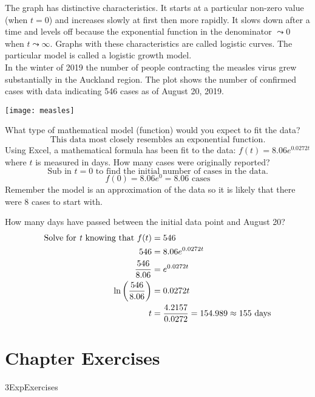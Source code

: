 The graph has distinctive characteristics. It starts at a particular non-zero value (when $t =0$) and increases slowly at first then more rapidly. It slows down after a time and levels off because the exponential function in the denominator $ \leadsto 0$ when $t \leadsto \infty $. Graphs with these characteristics are called logistic curves. The particular model is called a logistic growth model. 
\clearpage
\examq\medskip \\In the winter of 2019 the number of people contracting the measles virus grew substantially in the Auckland region. The plot shows the number of confirmed cases with data indicating 546 cases as of August 20, 2019.
\begin{center}
	\texttt{[image: measles]}
\end{center}
\begin{tasks}
	\task What type of mathematical model (function) would you expect to fit the data?\\
	\[\text{This data most closely resembles an exponential function.}\]
	\task Using Excel, a mathematical formula has been fit to the data:	$\displaystyle f(t)=8.06e^{0.0272t}$ where $t$ is measured in days. How many cases were originally reported?\\
	\[\text{Sub in $t=0$ to find the initial number of cases in the data.}\]
	\[f(0)=8.06e^0=8.06 \text{ cases}\]
	Remember the model is an approximation of the data so it is likely that there were 8 cases to start with.
	
	\task How many days have passed between the initial data point and August 20?\\
	\begin{align*}\text{Solve for \textit{t} knowing that }f(t)&=546\\
	546&=8.06e^{0.0272t}\\
	\frac{546}{8.06}&=e^{0.0272t}\\
	\ln\left(\frac{546}{8.06}\right)&=0.0272t\\
	t&=\frac{4.2157}{0.0272}=154.989\approx 155\text{ days}\\
	\end{align*}
\end{tasks}

\section{Chapter Exercises}
{3ExpExercises}

